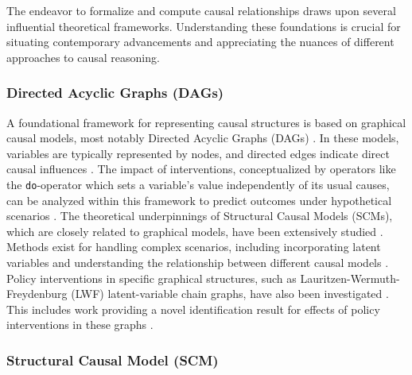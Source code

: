 The endeavor to formalize and compute causal relationships draws upon several influential theoretical frameworks. Understanding these foundations is crucial for situating contemporary advancements and appreciating the nuances of different approaches to causal reasoning.

\subsubsection{Directed Acyclic Graphs (DAGs)}

A foundational framework for representing causal structures is based on graphical causal models, most notably Directed Acyclic Graphs (DAGs) \cite{verma1986causal, pearl1988probabilistic, Glymour2019Review, koller2009probabilistic}. In these models, variables are typically represented by nodes, and directed edges indicate direct causal influences \cite{pearl1988probabilistic}. The impact of interventions, conceptualized by operators like the \texttt{do}-operator which sets a variable's value independently of its usual causes, can be analyzed within this framework to predict outcomes under hypothetical scenarios \cite{pearl1988probabilistic, Pearl2009Causality}. The theoretical underpinnings of Structural Causal Models (SCMs), which are closely related to graphical models, have been extensively studied \cite{pearl2000causality, Peters2017Elements, bareinboim2020causal, janzing2016algorithmic, Peters2022Causal}. Methods exist for handling complex scenarios, including incorporating latent variables \cite{Mohan2021Graphical, richardson2003causal} and understanding the relationship between different causal models \cite{Verma1990Equivalence, pearl2018theoretical}. Policy interventions in specific graphical structures, such as Lauritzen-Wermuth-Freydenburg (LWF) latent-variable chain graphs, have also been investigated \cite{sherman2020general}. This includes work providing a novel identification result for effects of policy interventions in these graphs \cite{sherman2020general}.

\subsubsection{Structural Causal Model (SCM)}

